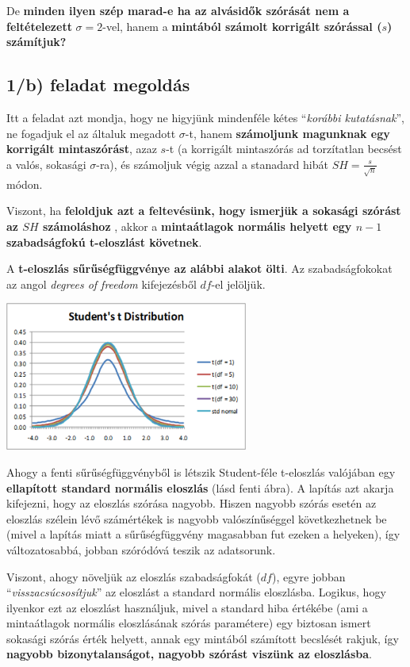 \documentclass[
]{book}
\begin{document}
De \textbf{minden ilyen szép marad-e ha az alvásidők szórását nem a feltételezett} \(\sigma=2\)-vel, hanem a \textbf{mintából számolt korrigált szórással (\(s\)) számítjuk?}

\subsection*{1/b) feladat megoldás}\label{b-feladat-megolduxe1s}

Itt a feladat azt mondja, hogy ne higyjünk mindenféle kétes ``\emph{korábbi kutatásnak}'', ne fogadjuk el az általuk megadott \(\sigma\)-t, hanem \textbf{számoljunk magunknak egy korrigált mintaszórást}, azaz \(s\)-t (a korrigált mintaszórás ad torzítatlan becsést a valós, sokasági \(\sigma\)-ra), és számoljuk végig azzal a stanadard hibát \(SH=\frac{s}{\sqrt{n}}\) módon.

Viszont, ha \textbf{feloldjuk azt a feltevésünk, hogy ismerjük a sokasági szórást az \(SH\) számoláshoz} , akkor a \textbf{mintaátlagok normális helyett egy \(n-1\) szabadságfokú t-eloszlást követnek}.

A \textbf{t-eloszlás sűrűségfüggvénye az alábbi alakot ölti}. Az szabadságfokokat az angol \emph{degrees of freedom} kifejezésből \(df\)-el jelöljük.

\includegraphics[width=0.6\textwidth,height=\textheight]{studentdistr.png}

Ahogy a fenti sűrűségfüggvényből is létszik Student-féle t-eloszlás valójában egy \textbf{ellapított standard normális eloszlás} (lásd fenti ábra). A lapítás azt akarja kifejezni, hogy az eloszlás szórása nagyobb. Hiszen nagyobb szórás esetén az eloszlás szélein lévő számértékek is nagyobb valószínűséggel következhetnek be (mivel a lapítás miatt a sűrűségfüggvény magasabban fut ezeken a helyeken), így változatosabbá, jobban szóródóvá teszik az adatsorunk.

Viszont, ahogy növeljük az eloszlás szabadságfokát (\(df\)), egyre jobban ``\emph{visszacsúcsosítjuk}'' az eloszlást a standard normális eloszlásba. Logikus, hogy ilyenkor ezt az eloszlást használjuk, mivel a standard hiba értékébe (ami a mintaátlagok normális eloszlásának szórás paramétere) egy biztosan ismert sokasági szórás érték helyett, annak egy mintából számított becslését rakjuk, így \textbf{nagyobb bizonytalanságot, nagyobb szórást viszünk az eloszlásba}.
\end{document}
